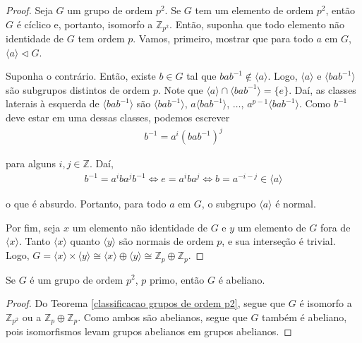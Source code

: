 	\begin{proof}
		Seja $G$ um grupo de ordem $p^2$. Se $G$ tem um elemento de ordem $p^2$, então $G$ é cíclico e, portanto, isomorfo a $\mathbb{Z}_{p^2}$. Então, suponha que todo elemento não identidade de $G$ tem ordem $p$. Vamos, primeiro, mostrar que para todo $a$ em $G$, $\langle a \rangle\vartriangleleft G$.
		
		\par\vspace{0.3cm} Suponha o contrário. Então, existe $b\in G$ tal que $bab^{-1}\notin\langle a \rangle$. Logo, $\langle a \rangle$ e $\langle bab^{-1} \rangle$ são subgrupos distintos de ordem $p$. Note que $\langle a \rangle\cap \langle bab^{-1} \rangle = \{e\}$. Daí, as classes laterais à esquerda de $\langle bab^{-1} \rangle$ são $\langle bab^{-1} \rangle$, $a\langle bab^{-1} \rangle$, $\dots$, $a^{p-1}\langle bab^{-1} \rangle$. Como $b^{-1}$ deve estar em uma dessas classes, podemos escrever
		\begin{align*}
		b^{-1} = a^i(bab^{-1})^j
		\end{align*}
		\par\vspace{0.3cm} para alguns $i,j\in\mathbb{Z}$. Daí,
		\begin{align*}
		b^{-1} = a^iba^jb^{-1} \Leftrightarrow e = a^iba^j \Leftrightarrow b = a^{-i-j}\in \langle a \rangle
		\end{align*}
		
		\par\vspace{0.3cm} o que é absurdo. Portanto, para todo $a$ em $G$, o subgrupo $\langle a \rangle$ é normal. 
		\par\vspace{0.3cm} Por fim, seja $x$ um elemento não identidade de $G$ e $y$ um elemento de $G$ fora de $\langle x \rangle$. Tanto $\langle x \rangle$ quanto $\langle y \rangle$ são normais de ordem $p$, e sua interseção é trivial. Logo, $G = \langle x \rangle\times\langle y \rangle\cong \langle x \rangle\oplus\langle y \rangle \cong \mathbb{Z}_p\oplus\mathbb{Z}_p$.
		
	\end{proof}
	
	\begin{corollary}
		\label{ordem p^2 implica abeliano}
		Se $G$ é um grupo de ordem $p^2$, $p$ primo, então $G$ é abeliano.
	\end{corollary}
	
	\begin{proof}
		Do Teorema \eqref{classificacao grupos de ordem p2}, segue que $G$ é isomorfo a $\mathbb{Z}_{p^2}$ ou a $\mathbb{Z}_p\oplus\mathbb{Z}_p$. Como ambos são abelianos, segue que $G$ também é abeliano, pois isomorfismos levam grupos abelianos em grupos abelianos.
	\end{proof}

